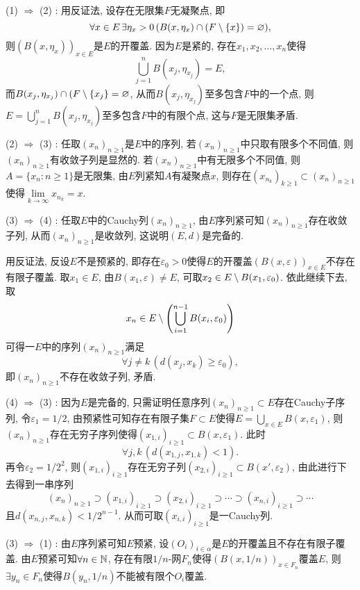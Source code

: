 \begin{Proof}
	(1) $ \Rightarrow $ (2) : 用反证法, 设存在无限集$ F $无凝聚点, 即
	\[
		\forall x\in E\,\exists\eta_x>0\,(B(x,\eta_x)\cap(F\setminus\{x\})=\varnothing),
	\]
	则$ (B(x,\eta_x))_{x\in E} $是$ E $的开覆盖. 因为$ E $是紧的, 存在$ x_1,x_2, \dots,x_n $使得
	\[
		\bigcup_{j=1}^nB(x_j,\eta_{x_j})=E,
	\]
	而$ B(x_j,\eta_{x_j})\cap(F\setminus\{x_j\}=\varnothing $, 从而$ B(x_j,\eta_{x_j}) $至多包含$ F $中的一个点, 则$ E=\bigcup_{j=1}^nB(x_j,\eta_{x_j}) $至多包含$ F $中的有限个点, 这与$ F $是无限集矛盾.

	(2) $ \Rightarrow $ (3) : 任取$ (x_n)_{n\geqslant 1} $是$ E $中的序列, 若$ (x_n)_{n\geqslant 1} $中只取有限多个不同值, 则$ (x_n)_{n\geqslant 1} $有收敛子列是显然的. 若$ (x_n)_{n\geqslant 1} $中有无限多个不同值, 则$ A=\{ x_n : n\geqslant 1 \} $是无限集, 由$ E $列紧知$ A $有凝聚点$ x $, 则存在$ (x_{n_k})_{k\geqslant 1}\subset(x_n)_{n\geqslant 1} $使得$ \lim\limits_{k\to\infty}x_{n_{k}}=x $.

	(3) $ \Rightarrow $ (4) : 任取$ E $中的Cauchy列$ (x_n)_{n\geqslant 1} $, 由$ E $序列紧可知$ (x_n)_{n\geqslant 1} $存在收敛子列, 从而$ (x_n)_{n\geqslant 1} $是收敛列, 这说明$ (E,d) $是完备的.

	用反证法, 反设$ E $不是预紧的, 即存在$ \varepsilon_0>0 $使得$ E $的开覆盖$ (B(x,\varepsilon))_{x\in E} $不存在有限子覆盖. 取$ x_1\in E $, 由$ B(x_1,\varepsilon)\ne E $, 可取$ x_2\in E\setminus B(x_1,\varepsilon_0) $. 依此继续下去, 取
	\[
		x_n\in E\setminus\left( \bigcup_{i=1}^{n-1}B(x_i,\varepsilon_0) \right)
	\]
	可得一$ E $中的序列$ (x_n)_{n\geqslant 1} $满足
	\[
		\forall j\ne k\,(d(x_j,x_k)\geqslant\varepsilon_0),
	\]
	即$ (x_n)_{n\geqslant 1} $不存在收敛子列, 矛盾.

	(4) $ \Rightarrow $ (3) : 因为$ E $是完备的, 只需证明任意序列$ (x_n)_{n\geqslant 1}\subset E $存在Cauchy子序列, 令$ \varepsilon_1=1/2 $, 由预紧性可知存在有限子集$ F\subset E $使得$ E=\bigcup_{x\in E}B(x,\varepsilon_1) $, 则$ (x_n)_{n\geqslant 1} $存在无穷子序列使得$ (x_{1,i})_{i\geqslant 1}\subset B(x,\varepsilon_1) $. 此时
	\[
		\forall j, k\,(d(x_{1,j},x_{1,k})<1).
	\]
	再令$ \varepsilon_2=1/2^2 $, 则$ (x_{1,i})_{i\geqslant 1} $存在无穷子列$ (x_{2,i})_{i\geqslant 1}\subset B(x',\varepsilon_2) $, 由此进行下去得到一串序列
	\[
		(x_n)_{n\geqslant 1}\supset(x_{1,i})_{i\geqslant 1}\supset(x_{2,i})_{i\geqslant 1}\supset\cdots\supset(x_{n,i})_{i\geqslant 1}\supset\cdots
	\]
	且$ d(x_{n,j},x_{n,k})<1/2^{n-1} $. 从而可取$ (x_{i,i})_{i\geqslant 1} $是一Cauchy列.

	(3) $ \Rightarrow $ (1) : 由$ E $序列紧可知$ E $预紧, 设$ (O_i)_{i\in\alpha} $是$ E $的开覆盖且不存在有限子覆盖. 由$ E $预紧可知$ \forall n\in\mathbb{N} $, 存在有限$ 1/n $-网$ F_n $使得$ (B(x,1/n))_{x\in F_n} $覆盖$ E $, 则$ \exists y_n\in F_n $使得$ B(y_n,1/n) $不能被有限个$ O_i $覆盖.


\end{Proof}
